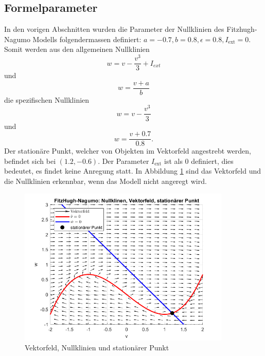 \begin{refsection}
\subsection{Formelparameter}
In den vorigen Abschnitten wurden die Parameter der Nullklinien des Fitzhugh-Nagumo Modells folgendermassen definiert:
\(a = -0.7, b = 0.8, \epsilon = 0.8, I_\text{ext} = 0\). Somit werden aus den allgemeinen Nullklinien \[ w = v - \frac{v^3}{3} + I_{ext}\]
und \[w = \frac{v + a}{b}\] die spezifischen Nullklinien \[ w = v - \frac{v^3}{3}\]
und \[w = \frac{v + 0.7}{0.8}.\]
Der stationäre Punkt, welcher von Objekten im Vektorfeld angestrebt werden, befindet sich bei $(1.2 ,-0.6)$.
Der Parameter $I_\text{ext}$ ist als 0 definiert, dies bedeutet, es findet keine Anregung statt.
In Abbildung \ref{fig:Parameter} sind das Vektorfeld und die Nullklinien erkennbar, wenn das Modell nicht angeregt wird.
\begin{figure}[h]
    \centering
    \includegraphics[width=0.9\textwidth]{papers/nerven/Bilder/Anregung1.png}
    \caption{Vektorfeld, Nullklinien und stationärer Punkt}
    \label{fig:Parameter}
\end{figure}

\end{refsection}
